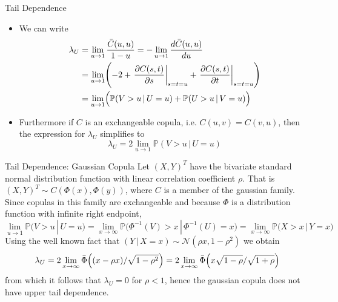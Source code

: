 \documentclass[11pt]{beamer}
\theoremstyle{plain}
\theoremstyle{definition}
\theoremstyle{remark}
\begin{document}
\begin{frame}{Tail Dependence}
   \begin{itemize}
		\item We can write
		\begin{equation}
			\begin{split}
			\lambda_U & = \lim\limits_{u\rightarrow 1} \frac{\bar C(u,u) }{1- u} = - \lim\limits_{u
			\rightarrow 1}  \frac{d\bar C(u,u)}{du}  \\
			                 & = \lim\limits_{u\rightarrow 1} 
			                       \Biggl(
										-2 + \left.\frac{\partial C(s,t)}{\partial s} \right|_{s=t=u}+ \left.
										\frac{\partial C(s,t)}{\partial t} \right|_{s=t=u}                       
			                       \Biggr) \\
			                 & = \lim\limits_{u\rightarrow 1} \Bigl(
			                           \mathbb{P} (V > u\, |\, U = u) + \mathbb{P} (U > u \,|\, V = u)      
			                       \Bigr)
			\end{split}
		\end{equation}
			\item Furthermore if $C$ is an exchangeable copula, i.e. $C(u,v) = C(v,u)$, then the 
			expression for $\lambda_U$ simplifies to			
			\begin{equation}
			\lambda_U =  2 \lim\limits_{u\rightarrow 1} \mathbb{P} (V > u\, |\, U = u)
			\end{equation}		
	\end{itemize}
\end{frame}
%
\begin{frame}{Tail Dependence: Gaussian Copula}
\footnotesize{
		Let $(X, Y)^T$ have the bivariate standard normal distribution 
		function with linear correlation coefficient $\rho$. That is $(X, Y)^T \sim C(\Phi(x), \Phi(y))$, 
		where $C$ is a member of the gaussian family. Since copulas in this family are exchangeable and 
		because $\Phi$ is a distribution function with infinite right endpoint,
		\begin{equation}
		    \lim\limits_{u\rightarrow 1}       \mathbb{P}\bigl(V > u\, |\, U = u \bigr)
		=  \lim\limits_{x\rightarrow \infty} \mathbb{P}\bigl(\Phi^{-1}(V)>x\, |\,\Phi^{-1} (U) = x \bigr)
		= \lim\limits_{x\rightarrow \infty} \mathbb{P}\bigl(X>x\, |\,Y = x \bigr)
		\end{equation}
		Using the well known fact that $(Y \,\vert \, X = x) \sim \mathcal{N}(\rho x, 1-\rho^2)$ we 
		obtain		
		\begin{equation}
		\lambda_U = 2 \lim\limits_{x\rightarrow \infty}\bar \Phi \Bigl( (x -\rho x)/\sqrt{1-\rho^2} 
		\Bigr) =
		2 \lim\limits_{x\rightarrow \infty}\bar \Phi \Bigl( x \sqrt{1-\rho}/\sqrt{1+\rho} \Bigr)
		\end{equation}
		from which it follows that $\lambda_U = 0$ for $\rho < 1$, hence the gaussian copula does not 
		have upper tail dependence.
}
\end{frame}
\end{document}
